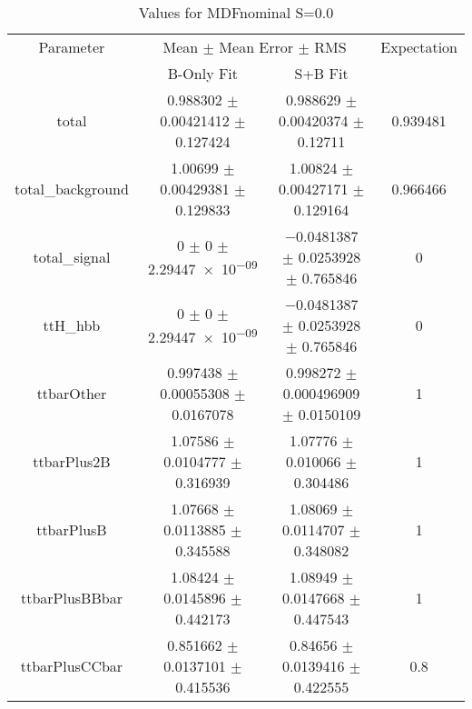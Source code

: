 \begin{table}
\centering
\caption{Values for MDFnominal S=0.0}
\begin{tabular}{cccc}
\toprule
Parameter & \multicolumn{2}{c}{Mean $\pm$ Mean Error $\pm$ RMS} & Expectation\\
 & B-Only Fit & S+B Fit & \\
\midrule
total & \num{0.988302} $\pm$ \num{0.00421412} $\pm$ \num{0.127424} & \num{0.988629} $\pm$ \num{0.00420374} $\pm$ \num{0.12711} & \num{0.939481}\\
total\_background & \num{1.00699} $\pm$ \num{0.00429381} $\pm$ \num{0.129833} & \num{1.00824} $\pm$ \num{0.00427171} $\pm$ \num{0.129164} & \num{0.966466}\\
total\_signal & \num{0} $\pm$ \num{0} $\pm$ \num{2.29447e-09} & \num{-0.0481387} $\pm$ \num{0.0253928} $\pm$ \num{0.765846} & \num{0}\\
ttH\_hbb & \num{0} $\pm$ \num{0} $\pm$ \num{2.29447e-09} & \num{-0.0481387} $\pm$ \num{0.0253928} $\pm$ \num{0.765846} & \num{0}\\
ttbarOther & \num{0.997438} $\pm$ \num{0.00055308} $\pm$ \num{0.0167078} & \num{0.998272} $\pm$ \num{0.000496909} $\pm$ \num{0.0150109} & \num{1}\\
ttbarPlus2B & \num{1.07586} $\pm$ \num{0.0104777} $\pm$ \num{0.316939} & \num{1.07776} $\pm$ \num{0.010066} $\pm$ \num{0.304486} & \num{1}\\
ttbarPlusB & \num{1.07668} $\pm$ \num{0.0113885} $\pm$ \num{0.345588} & \num{1.08069} $\pm$ \num{0.0114707} $\pm$ \num{0.348082} & \num{1}\\
ttbarPlusBBbar & \num{1.08424} $\pm$ \num{0.0145896} $\pm$ \num{0.442173} & \num{1.08949} $\pm$ \num{0.0147668} $\pm$ \num{0.447543} & \num{1}\\
ttbarPlusCCbar & \num{0.851662} $\pm$ \num{0.0137101} $\pm$ \num{0.415536} & \num{0.84656} $\pm$ \num{0.0139416} $\pm$ \num{0.422555} & \num{0.8}\\
\bottomrule
\end{tabular}
\end{table}